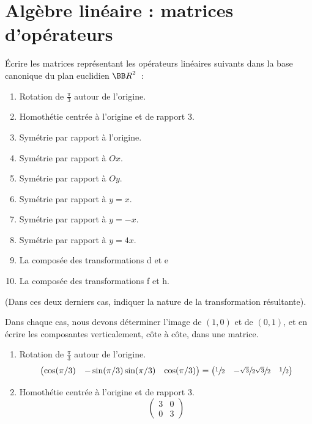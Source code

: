 \documentclass[12pt,french,oneside,a4paper]{memoir} %
\begin{document}
\chapter{Algèbre linéaire : matrices d'opérateurs}
\begin{exo} %
Écrire les matrices représentant les opérateurs linéaires 
suivants dans la base canonique du plan euclidien ${\BB R}^2$~:
\begin{enumerate}
\item Rotation de $\frac{\pi}{3}$ autour de l'origine.
\item Homothétie centrée à l'origine et de rapport 3.
\item Symétrie par rapport à l'origine.
\item Symétrie par rapport à $Ox$.
\item Symétrie par rapport à $Oy$.
\item Symétrie par rapport à $y=x$.
\item Symétrie par rapport à $y=-x$.
\item Symétrie par rapport à $y=4x$.
\item La composée des transformations d et e
\item La composée des transformations f et h.
\end{enumerate}
(Dans ces deux derniers cas, indiquer la nature de la transformation résultante).

\begin{correction}
  Dans chaque cas, nous devons déterminer l'image de $(1,0)$ et de $(0,1)$, et en écrire les composantes verticalement, côte à côte, dans une matrice.
  \begin{enumerate}
  \item Rotation de $\frac{\pi}{3}$ autour de l'origine.
    \begin{equation*}
      \begin{pmatrix}
        \cos(\pi/3) & -\sin(\pi/3)
        \sin(\pi/3) & \cos(\pi/3)
      \end{pmatrix} = 
      \begin{pmatrix}
        \sfrac12 & -\sfrac{\sqrt 3}2
        \sfrac{\sqrt 3}2 & \sfrac12
      \end{pmatrix}
    \end{equation*}
  \item Homothétie centrée à l'origine et de rapport 3.
    \begin{equation*}
      \begin{pmatrix}
        3 & 0\\ 0 & 3
      \end{pmatrix}
    \end{equation*}


\end{enumerate}
\end{correction}
\end{exo}
\end{document}
